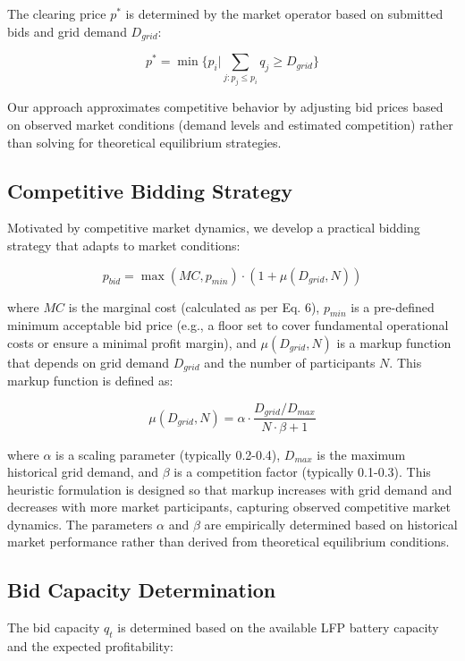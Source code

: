 \documentclass[11pt,a4paper]{article}
\begin{document}
The clearing price $p^*$ is determined by the market operator based on submitted bids and grid demand $D_{grid}$:

\begin{equation}
p^* = \min\{p_i | \sum_{j: p_j \leq p_i} q_j \geq D_{grid}\}
\end{equation}

Our approach approximates competitive behavior by adjusting bid prices based on observed market conditions (demand levels and estimated competition) rather than solving for theoretical equilibrium strategies.

\subsection{Competitive Bidding Strategy}
Motivated by competitive market dynamics, we develop a practical bidding strategy that adapts to market conditions:

\begin{equation}
p_{bid} = \max(MC, p_{min}) \cdot (1 + \mu(D_{grid}, N))
\end{equation}

where $MC$ is the marginal cost (calculated as per Eq. 6), $p_{min}$ is a pre-defined minimum acceptable bid price (e.g., a floor set to cover fundamental operational costs or ensure a minimal profit margin), and $\mu(D_{grid}, N)$ is a markup function that depends on grid demand $D_{grid}$ and the number of participants $N$. This markup function is defined as:

\begin{equation}
\mu(D_{grid}, N) = \alpha \cdot \frac{D_{grid}/D_{max}}{N \cdot \beta + 1}
\end{equation}

where $\alpha$ is a scaling parameter (typically 0.2-0.4), $D_{max}$ is the maximum historical grid demand, and $\beta$ is a competition factor (typically 0.1-0.3). This heuristic formulation is designed so that markup increases with grid demand and decreases with more market participants, capturing observed competitive market dynamics. The parameters $\alpha$ and $\beta$ are empirically determined based on historical market performance rather than derived from theoretical equilibrium conditions.

\subsection{Bid Capacity Determination}
The bid capacity $q_t$ is determined based on the available LFP battery capacity and the expected profitability:
\end{document}
